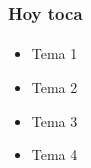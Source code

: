\documentclass[aspectratio=169]{beamer}
\begin{document}
\Portada

\begin{frame}
  \frametitle{Hoy toca}
  \framesubtitle{}
  \begin{itemize}
    \item Tema 1
    \item Tema 2
    \item Tema 3
    \item Tema 4
  \end{itemize}
\end{frame}

\Dudas

\Cita{\TextoCita}{\FuenteCita}

\Redes

\Despedida
\end{document}
